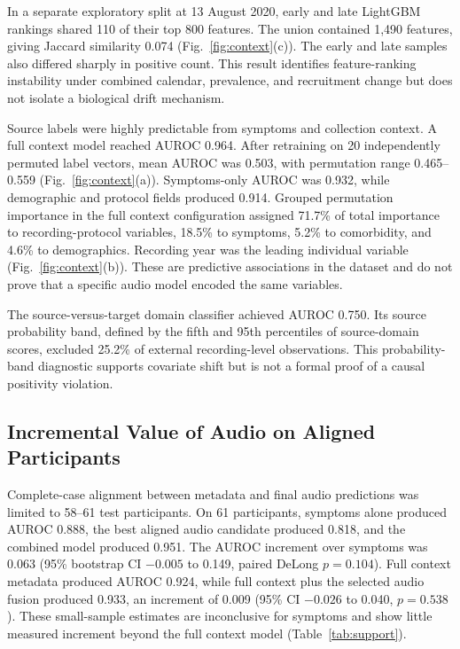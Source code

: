 \documentclass[journal]{IEEEtran}
\begin{document}
In a separate exploratory split at 13 August 2020, early and late LightGBM rankings shared 110 of their top 800 features. The union contained 1,490 features, giving Jaccard similarity 0.074 (Fig.~\ref{fig:context}(c)). The early and late samples also differed sharply in positive count. This result identifies feature-ranking instability under combined calendar, prevalence, and recruitment change but does not isolate a biological drift mechanism.

Source labels were highly predictable from symptoms and collection context. A full context model reached AUROC 0.964. After retraining on 20 independently permuted label vectors, mean AUROC was 0.503, with permutation range 0.465--0.559 (Fig.~\ref{fig:context}(a)). Symptoms-only AUROC was 0.932, while demographic and protocol fields produced 0.914. Grouped permutation importance in the full context configuration assigned 71.7\% of total importance to recording-protocol variables, 18.5\% to symptoms, 5.2\% to comorbidity, and 4.6\% to demographics. Recording year was the leading individual variable (Fig.~\ref{fig:context}(b)). These are predictive associations in the dataset and do not prove that a specific audio model encoded the same variables.

The source-versus-target domain classifier achieved AUROC 0.750. Its source probability band, defined by the fifth and 95th percentiles of source-domain scores, excluded 25.2\% of external recording-level observations. This probability-band diagnostic supports covariate shift but is not a formal proof of a causal positivity violation.

\subsection{Incremental Value of Audio on Aligned Participants}

Complete-case alignment between metadata and final audio predictions was limited to 58--61 test participants. On 61 participants, symptoms alone produced AUROC 0.888, the best aligned audio candidate produced 0.818, and the combined model produced 0.951. The AUROC increment over symptoms was 0.063 (95\% bootstrap CI $-0.005$ to 0.149, paired DeLong $p=0.104$). Full context metadata produced AUROC 0.924, while full context plus the selected audio fusion produced 0.933, an increment of 0.009 (95\% CI $-0.026$ to 0.040, $p=0.538$). These small-sample estimates are inconclusive for symptoms and show little measured increment beyond the full context model (Table~\ref{tab:support}).
\end{document}
